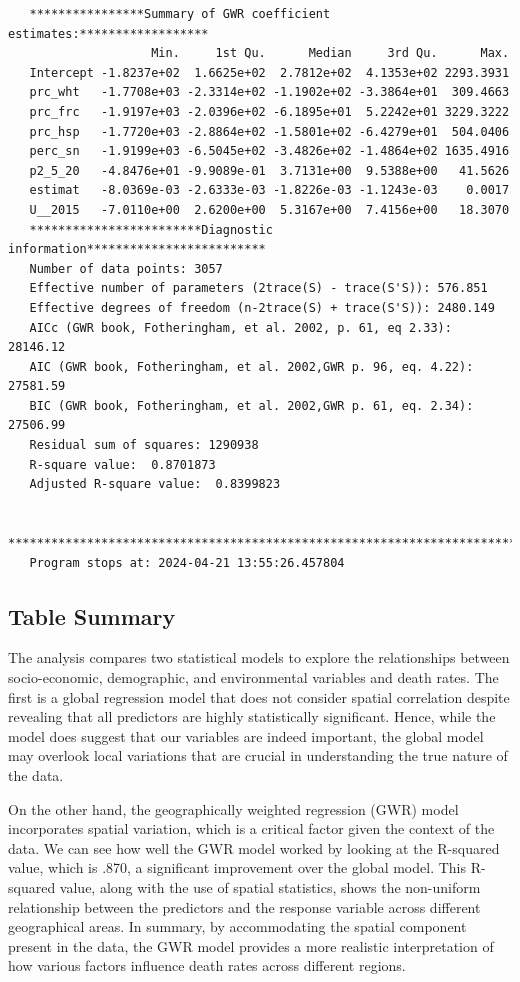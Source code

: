 \documentclass[
]{article}
\begin{document}
\begin{verbatim}
   ****************Summary of GWR coefficient estimates:******************
                    Min.     1st Qu.      Median     3rd Qu.      Max.
   Intercept -1.8237e+02  1.6625e+02  2.7812e+02  4.1353e+02 2293.3931
   prc_wht   -1.7708e+03 -2.3314e+02 -1.1902e+02 -3.3864e+01  309.4663
   prc_frc   -1.9197e+03 -2.0396e+02 -6.1895e+01  5.2242e+01 3229.3222
   prc_hsp   -1.7720e+03 -2.8864e+02 -1.5801e+02 -6.4279e+01  504.0406
   perc_sn   -1.9199e+03 -6.5045e+02 -3.4826e+02 -1.4864e+02 1635.4916
   p2_5_20   -4.8476e+01 -9.9089e-01  3.7131e+00  9.5388e+00   41.5626
   estimat   -8.0369e-03 -2.6333e-03 -1.8226e-03 -1.1243e-03    0.0017
   U__2015   -7.0110e+00  2.6200e+00  5.3167e+00  7.4156e+00   18.3070
   ************************Diagnostic information*************************
   Number of data points: 3057 
   Effective number of parameters (2trace(S) - trace(S'S)): 576.851 
   Effective degrees of freedom (n-2trace(S) + trace(S'S)): 2480.149 
   AICc (GWR book, Fotheringham, et al. 2002, p. 61, eq 2.33): 28146.12 
   AIC (GWR book, Fotheringham, et al. 2002,GWR p. 96, eq. 4.22): 27581.59 
   BIC (GWR book, Fotheringham, et al. 2002,GWR p. 61, eq. 2.34): 27506.99 
   Residual sum of squares: 1290938 
   R-square value:  0.8701873 
   Adjusted R-square value:  0.8399823 

   ***********************************************************************
   Program stops at: 2024-04-21 13:55:26.457804 
\end{verbatim}

\subsection{Table Summary}\label{table-summary}

The analysis compares two statistical models to explore the
relationships between socio-economic, demographic, and environmental
variables and death rates. The first is a global regression model that
does not consider spatial correlation despite revealing that all
predictors are highly statistically significant. Hence, while the model
does suggest that our variables are indeed important, the global model
may overlook local variations that are crucial in understanding the true
nature of the data.

On the other hand, the geographically weighted regression (GWR) model
incorporates spatial variation, which is a critical factor given the
context of the data. We can see how well the GWR model worked by looking
at the R-squared value, which is .870, a significant improvement over
the global model. This R-squared value, along with the use of spatial
statistics, shows the non-uniform relationship between the predictors
and the response variable across different geographical areas. In
summary, by accommodating the spatial component present in the data, the
GWR model provides a more realistic interpretation of how various
factors influence death rates across different regions.
\end{document}
